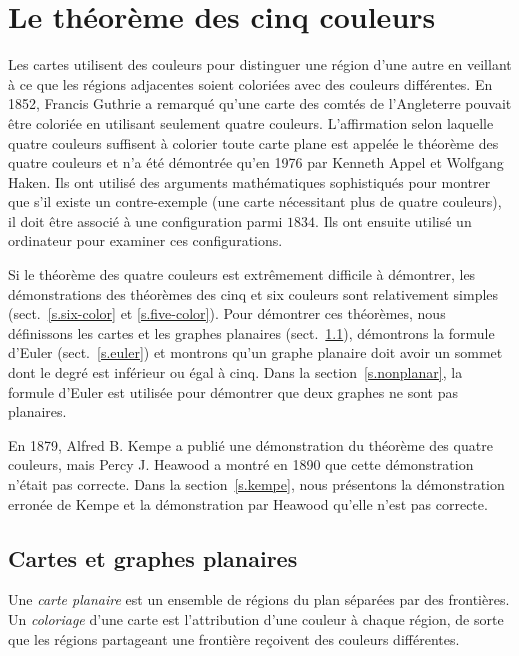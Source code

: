 
\chapter{Le théorème des cinq couleurs}\label{c.five}




Les cartes utilisent des couleurs pour distinguer une région d'une autre en veillant à ce que les régions adjacentes soient coloriées avec des couleurs différentes. En 1852, Francis Guthrie a remarqué qu'une carte des comtés de l'Angleterre pouvait être coloriée en utilisant seulement quatre couleurs. L'affirmation selon laquelle quatre couleurs suffisent à colorier toute carte plane est appelée le théorème des quatre couleurs et n'a été démontrée qu'en 1976 par Kenneth Appel et Wolfgang Haken. Ils ont utilisé des arguments mathématiques sophistiqués pour montrer que s'il existe un contre-exemple (une carte nécessitant plus de quatre couleurs), il doit être associé à une configuration parmi $1834$. Ils ont ensuite utilisé un ordinateur pour examiner ces configurations.

Si le théorème des quatre couleurs est extrêmement difficile à démontrer, les démonstrations des théorèmes des cinq et six couleurs sont relativement simples (sect.~\ref{s.six-color} et \ref{s.five-color}). Pour démontrer ces théorèmes, nous définissons les cartes et les graphes planaires (sect.~\ref{s.planar}), démontrons la formule d'Euler (sect.~\ref{s.euler}) et montrons qu'un graphe planaire doit avoir un sommet dont le degré est inférieur ou égal à cinq. Dans la section~\ref{s.nonplanar}, la formule d'Euler est utilisée pour démontrer que deux graphes ne sont pas planaires.

En 1879, Alfred B. Kempe a publié une démonstration du théorème des quatre couleurs, mais  Percy J. Heawood a montré en 1890 que cette démonstration n'était pas correcte. Dans la section~\ref{s.kempe}, nous présentons la démonstration erronée de Kempe et la démonstration par Heawood qu'elle n'est pas correcte.

\section{Cartes  et graphes planaires}\label{s.planar}

\begin{definition}
Une \emph{carte planaire} est un ensemble de régions du plan séparées par des frontières. Un \emph{coloriage} d'une carte est l'attribution d'une couleur à chaque région, de sorte que les régions partageant une frontière reçoivent des couleurs différentes.
\end{definition}

